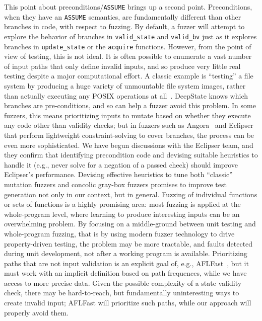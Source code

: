   This point about preconditions/{\tt ASSUME} brings up a second point.  Preconditions, when they have an {\tt ASSUME} semantics, are fundamentally different than other branches in code, with respect to fuzzing.  By default, a fuzzer will attempt to explore the behavior of branches in {\tt valid\_state} and {\tt valid\_bv} just as it explores branches in {\tt update\_state} or the {\tt acquire} functions.  However, from the point of view of testing, this is not ideal.  It is often possible to enumerate a vast number of input paths that only define invalid inputs, and so produce very little real testing despite a major computational effort.  A classic example is ``testing'' a file system by producing a huge variety of unmountable file system images, rather than actually executing any POSIX operations at all~\cite{CFV08,AMAI}.  DeepState knows which branches are pre-conditions, and so can help a fuzzer avoid this problem.  In some fuzzers, this means prioritizing inputs to mutate based on whether they execute any code other than validity checks; but in fuzzers such as Angora~\cite{angora} and Eclipser~\cite{eclipser} that perform lightweight constraint-solving to cover branches, the process can be even more sophisticated.  We have begun discussions with the Eclipser team, and they confirm that identifying precondition code and devising suitable heuristics to handle it (e.g., never solve for a negation of a passed check) should improve Eclipser's performance.  Devising effective heuristics to tune both ``classic'' mutation fuzzers and concolic gray-box fuzzers promises to improve test generation not only in our context, but in general.  Fuzzing of individual functions or sets of functions is a highly promising area: most fuzzing is applied at the whole-program level, where learning to produce interesting inputs can be an overwhelming problem.  By focusing on a middle-ground between unit testing and whole-program fuzzing, that is by using modern fuzzer technology to drive property-driven testing, the problem may be more tractable, and faults detected during unit development, not after a working program is available.  Prioritizing paths that are not input validation is an explicit goal of, e.g., AFLFast~\cite{aflfast}, but it must work with an implicit definition based on path frequences, while we have access to more precise data.  Given the possible complexity of a state validity check, there may be hard-to-reach, but fundamentally uninteresting ways to create invalid input; AFLFast will prioritize such paths, while our approach will properly avoid them.

